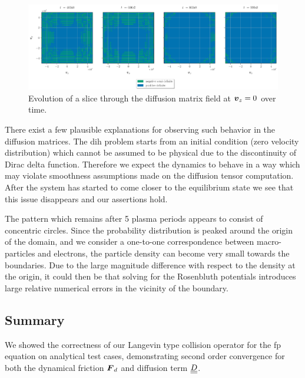 \begin{figure}[!ht]
    \begin{center}
    \hspace*{-1.3cm}
        \includegraphics[width=1.18\textwidth]{figures/results/D_cholesky_time.pdf}
    \end{center}
    \caption{Evolution of a slice through the diffusion matrix field at $\boldsymbol{v}_z = 0$ over time.}
    \label{fig:D_cholesky_time}
\end{figure}

There exist a few plausible explanations for observing such behavior in the diffusion matrices.
The \gls{dih} problem starts from an initial condition (zero velocity distribution) which cannot be
assumed to be physical due to the discontinuity of Dirac delta function.
Therefore we expect the dynamics to behave in a way which may violate smoothness assumptions made on the diffusion tensor computation. 
After the system has started to come closer to the equilibrium state we see that this issue
disappears and our assertions hold.

The pattern which remains after 5 plasma periods appears to consist of concentric circles.
Since the probability distribution is peaked around the origin of the domain, and we consider a
one-to-one correspondence between macro-particles and electrons, the particle density can become
very small towards the boundaries.
Due to the large magnitude difference with respect to the density at the origin, it could then be that
solving for the Rosenbluth potentials introduces large relative numerical errors in the vicinity of the boundary.

\subsection{Summary}

We showed the correctness of our Langevin type collision operator for the \gls{fp} equation on
analytical test cases, demonstrating second order convergence for both the dynamical friction
$\boldsymbol{F}_d$ and diffusion term $\underline{\underline{D}}$.

